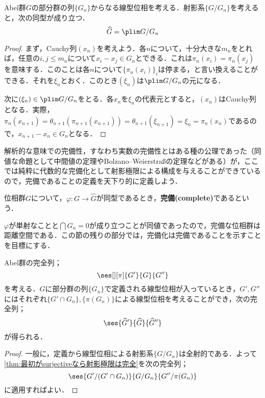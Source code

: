 \begin{thm}[代数的な完備化]
	Abel群$G$の部分群の列$\{G_n\}$からなる線型位相を考える．射影系$\{G/G_n\}$を考えると，次の同型が成り立つ．
	\[\widehat{G}=\plim G/G_n\]
\end{thm}

\begin{proof}
	まず，Cauchy列$(x_n)$を考えよう．各$n$について，十分大きな$m_n$をとれば，任意の$i,j\leq m_n$について$x_i-x_j\in G_n$とできる．これは$\pi_n(x_i)=\pi_n(x_j)$を意味する．このことは各$n$について$\{\pi_n(x_i)\}_i$は停まる，と言い換えることができる．それを$\xi_n$とおく．このとき$(\xi_n)$は$\plim G/G_n$の元になる．
	
	次に$(\xi_n)\in\plim G/G_n$をとる．各$x_n$を$\xi_n$の代表元とすると，$(x_n)$はCauchy列となる．実際，$\pi_n(x_{n+1})=\theta_{n+1}(\pi_{n+1}(x_{n+1}))=\theta_{n+1}(\xi_{n+1})=\xi_n=\pi_n(x_n)$であるので，$x_{n+1}-x_n\in G_n$となる．
\end{proof}

解析的な意味での完備性，すなわち実数の完備性とはある種の公理であった（同値な命題として中間値の定理やBolzano--Weierstra\ss の定理などがある）が，ここでは純粋に代数的な完備化として射影極限による構成を与えることができているので，完備であることの定義を天下り的に定義しよう．

\begin{defi}[完備]
	位相群$G$について，$\varphi:G\to\widehat{G}$が同型であるとき，\textbf{完備(complete)}であるという．
\end{defi}

$\varphi$が単射なことと$\bigcap G_n=0$が成り立つことが同値であったので，完備な位相群は距離空間である．この節の残りの部分では，完備化は完備であることを示すことを目標にする．

\begin{prop}\label{prop:位相群において完備化は完全}
	Abel群の完全列；
	\[\ses[][\pi]{G'}{G}{G''}\]
	を考える．$G$に部分群の列$\{G_n\}$で定義される線型位相が入っているとき，$G',G''$にはそれぞれ$\{G'\cap G_n\},\{\pi(G_n)\}$による線型位相を考えることができ，次の完全列；
	\[\ses{\widehat{G}'}{\widehat{G}}{\widehat{G}''}\]
	が得られる．
\end{prop}

\begin{proof}
	一般に，定義から線型位相による射影系$\{G/G_n\}$は全射的である．よって\ref{thm:最初がsurjectiveなら射影極限は完全}を次の完全列；
	\[\ses{G'/(G'\cap G_n)}{G/G_n}{G''/\pi(G_n)}\]
	に適用すればよい．
\end{proof}

